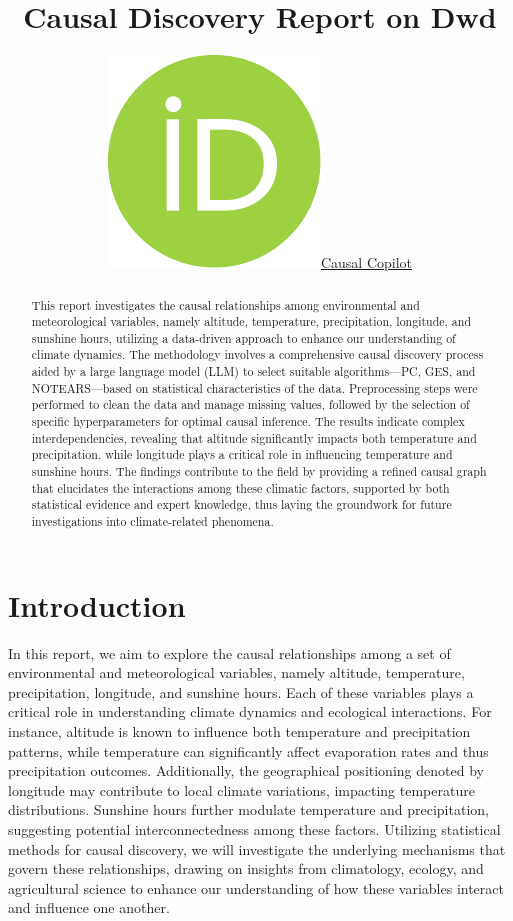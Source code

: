 \documentclass{article}
\title{Causal Discovery Report on Dwd}
\author{ \href{https://orcid.org/0000-0000-0000-0000}{\includegraphics[scale=0.06]{postprocess/context/orcid.pdf}\hspace{1mm}Causal Copilot}}
\begin{document}
\maketitle

\begin{abstract}
This report investigates the causal relationships among environmental and meteorological variables, namely altitude, temperature, precipitation, longitude, and sunshine hours, utilizing a data-driven approach to enhance our understanding of climate dynamics. The methodology involves a comprehensive causal discovery process aided by a large language model (LLM) to select suitable algorithms—PC, GES, and NOTEARS—based on statistical characteristics of the data. Preprocessing steps were performed to clean the data and manage missing values, followed by the selection of specific hyperparameters for optimal causal inference. The results indicate complex interdependencies, revealing that altitude significantly impacts both temperature and precipitation, while longitude plays a critical role in influencing temperature and sunshine hours. The findings contribute to the field by providing a refined causal graph that elucidates the interactions among these climatic factors, supported by both statistical evidence and expert knowledge, thus laying the groundwork for future investigations into climate-related phenomena.
\end{abstract}


\raggedbottom
\section{Introduction}
In this report, we aim to explore the causal relationships among a set of environmental and meteorological variables, namely altitude, temperature, precipitation, longitude, and sunshine hours. Each of these variables plays a critical role in understanding climate dynamics and ecological interactions. For instance, altitude is known to influence both temperature and precipitation patterns, while temperature can significantly affect evaporation rates and thus precipitation outcomes. Additionally, the geographical positioning denoted by longitude may contribute to local climate variations, impacting temperature distributions. Sunshine hours further modulate temperature and precipitation, suggesting potential interconnectedness among these factors. Utilizing statistical methods for causal discovery, we will investigate the underlying mechanisms that govern these relationships, drawing on insights from climatology, ecology, and agricultural science to enhance our understanding of how these variables interact and influence one another.
\end{document}
